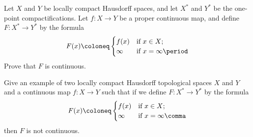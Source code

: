 \documentclass[a4paper,twoside,nols,nobib]{tufte-handout}
\begin{document}

\begin{Problem}
	\noindent
	Let $X$ and $Y$ be locally compact Hausdorff spaces, and let $X^*$ and $Y^*$ be the one-point compactifications.
	Let $f \colon X \to Y$ be a proper continuous map, and define $F \colon X^* \to Y^*$ by the formula
	\[
		F (x) \coloneq \begin{cases}
			f(x) & \text{if } x\in X\rlap{\ }\text{;}\\
			\infty & \text{if } x=\infty \period
		\end{cases}
	\]
	Prove that $F$ is continuous.
\end{Problem}


\begin{Problem}
	\noindent
	Give an example of two locally compact Hausdorff topological spaces $X$ and $Y$ and a continuous map $f \colon X \to Y$ such that if we define $F \colon X^* \to Y^*$ by the formula
	\[
		F (x) \coloneq \begin{cases}
			f(x) & \text{if } x\in X\rlap{\ }\text{;}\\
			\infty & \text{if } x=\infty \comma
		\end{cases}
	\]
	then $F$ is not continuous.
\end{Problem}

\end{document}
